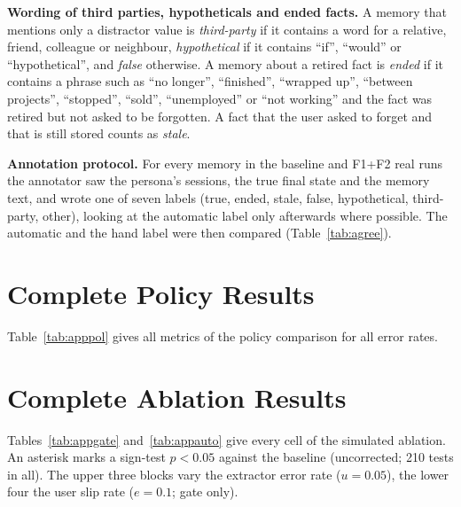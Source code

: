 \IfFileExists{IEEEtran.cls}{\documentclass[journal]{IEEEtran}\def\HAVEIEEE{1}}{\documentclass[10pt,twocolumn]{article}\usepackage[margin=0.7in,columnsep=0.25in]{geometry}}
\begin{document}
\textbf{Wording of third parties, hypotheticals and ended facts.} A memory that mentions only a distractor value is \emph{third-party} if it contains a word for a relative, friend, colleague or neighbour, \emph{hypothetical} if it contains ``if'', ``would'' or ``hypothetical'', and \emph{false} otherwise. A memory about a retired fact is \emph{ended} if it contains a phrase such as ``no longer'', ``finished'', ``wrapped up'', ``between projects'', ``stopped'', ``sold'', ``unemployed'' or ``not working'' and the fact was retired but not asked to be forgotten. A fact that the user asked to forget and that is still stored counts as \emph{stale}.

\textbf{Annotation protocol.} For every memory in the baseline and F1+F2 real runs the annotator saw the persona's sessions, the true final state and the memory text, and wrote one of seven labels (true, ended, stale, false, hypothetical, third-party, other), looking at the automatic label only afterwards where possible. The automatic and the hand label were then compared (Table~\ref{tab:agree}).

\section{Complete Policy Results}
Table~\ref{tab:apppol} gives all metrics of the policy comparison for all error rates.

\begin{table}[!ht]
\centering\footnotesize
\caption{All policies, all extractor error rates (simulated, $u=0.05$; mean per persona).}
\label{tab:apppol}
\end{table}

\FloatBarrier
\section{Complete Ablation Results}
Tables~\ref{tab:appgate} and~\ref{tab:appauto} give every cell of the simulated ablation. An asterisk marks a sign-test $p<0.05$ against the baseline (uncorrected; 210 tests in all). The upper three blocks vary the extractor error rate ($u=0.05$), the lower four the user slip rate ($e=0.1$; gate only).

\begin{table}[!ht]
\centering\footnotesize
\caption{Ablation, gate policy: all cells (60 paired persona runs each). * : uncorrected $p<0.05$.}
\label{tab:appgate}
\end{table}
\end{document}
